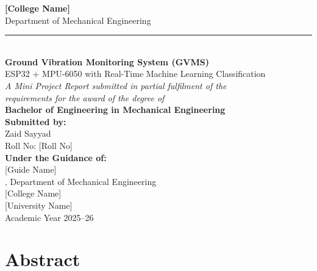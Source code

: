 \documentclass[12pt,a4paper]{report}
\begin{document}
\begin{titlepage}
  \centering
  \vspace*{0.5cm}
  {\Large \textbf{[College Name]}}\\[0.3cm]
  {\large Department of Mechanical Engineering}\\[0.2cm]
  \rule{\linewidth}{0.5pt}\\[1.5cm]

  {\LARGE \textbf{Ground Vibration Monitoring System (GVMS)}}\\[0.5cm]
  {\large ESP32 + MPU-6050 with Real-Time Machine Learning Classification}\\[1.5cm]

  \textit{A Mini Project Report submitted in partial fulfilment of the\\
  requirements for the award of the degree of}\\[0.5cm]
  {\large \textbf{Bachelor of Engineering in Mechanical Engineering}}\\[1.5cm]

  \textbf{Submitted by:}\\[0.3cm]
  {\large Zaid Sayyad}\\
  Roll No: [Roll No]\\[1.5cm]

  \textbf{Under the Guidance of:}\\[0.3cm]
  {\large [Guide Name]}\\
  [Designation], Department of Mechanical Engineering\\[2cm]

  {\large [College Name]}\\
  {\large [University Name]}\\[0.5cm]
  {\large Academic Year 2025--26}

\end{titlepage}

\setcounter{page}{1}

\chapter*{Abstract}
\end{document}
